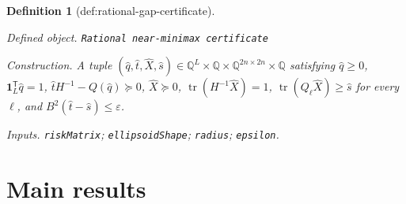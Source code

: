 \documentclass{article}
\newtheorem{definition}{Definition}
\begin{document}
\begin{definition}[def:rational-gap-certificate]\label{def:rational-gap-certificate}
\par\smallskip\noindent\emph{Defined object.} \texttt{Rational near-\allowbreak{}minimax certificate}
\par\smallskip\noindent\emph{Construction.} A tuple \((\widehat q,\widehat t,\widehat X,\widehat s)\in\mathbb Q^L\times\mathbb Q\times\mathbb Q^{2n\times2n}\times\mathbb Q\) satisfying \(\widehat q\ge0\), \(\mathbf 1_L^{\mathsf T}\widehat q=1\), \(\widehat tH^{-1}-Q(\widehat q)\succeq0\), \(\widehat X\succeq0\), \(\operatorname{tr}(H^{-1}\widehat X)=1\), \(\operatorname{tr}(Q_{\ell}\widehat X)\ge\widehat s\) for every \(\ell\), and \(B^2(\widehat t-\widehat s)\le\varepsilon\).
\par\smallskip\noindent\emph{Inputs.} \texttt{riskMatrix}; \texttt{ellipsoidShape}; \texttt{radius}; \texttt{epsilon}.
\end{definition}

\section{Main results}
\end{document}
